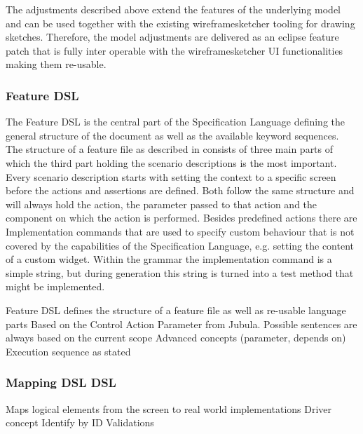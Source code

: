 \documentclass{sig-alternate-05-2015}
\begin{document}
The adjustments described above extend the features of the underlying model and can be used together with the existing wireframesketcher tooling for drawing sketches.
Therefore, the model adjustments are delivered as an eclipse feature patch that is fully inter operable with the wireframesketcher UI functionalities making them re-usable.

\subsubsection{Feature DSL}
The Feature DSL is the central part of the Specification Language defining the general structure of the document as well as the available keyword sequences.
The structure of a feature file as described in  consists of three main parts of which the third part holding the scenario descriptions is the most important.
Every scenario description starts with setting the context to a specific screen before the actions and assertions are defined.
Both follow the same structure and will always hold the action, the parameter passed to that action and the component on which the action is performed.
Besides predefined actions there are Implementation commands that are used to specify custom behaviour that is not covered by the capabilities of the Specification Language, e.g. setting the content of a custom widget.
Within the grammar the implementation command is a simple string, but during generation this string is turned into a test method that might be implemented. 


Feature DSL defines the structure of a feature file as well as re-usable language parts
Based on the Control Action Parameter from Jubula.
Possible sentences are always based on the current scope
Advanced concepts (parameter, depends on)
Execution sequence as stated

\subsubsection{Mapping DSL DSL}
Maps logical elements from the screen to real world implementations
Driver concept
Identify by ID
Validations
\end{document}
